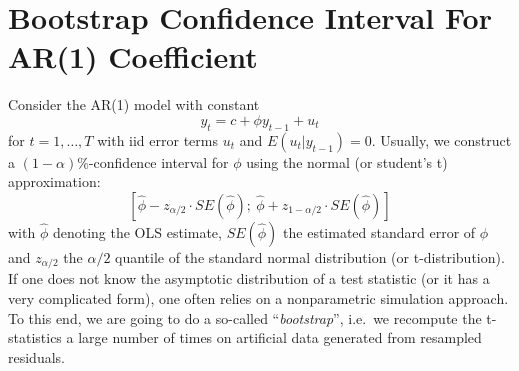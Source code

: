 \section[Bootstrap Confidence Interval For AR(1) Coefficient]{Bootstrap Confidence Interval For AR(1) Coefficient\label{ex:BootstrapConfidenceIntervalARone}}
Consider the AR(1) model with constant
\begin{equation*}
y_{t}=c +\phi y_{t-1}+u_{t}
\end{equation*}
for \(t=1,\ldots ,T\) with iid error terms \(u_{t}\) and \(E(u_{t}|y_{t-1})=0\).
Usually, we construct a \( (1-\alpha)\% \)-confidence interval for \( \phi \) using the normal (or student's t) approximation:
\begin{equation*}
\left[ \hat{\phi}-z_{\alpha/2}\cdot SE(\hat{\phi});\ \hat{\phi}+z_{1-\alpha/2}\cdot SE(\hat{\phi})\right]
\end{equation*}
  with \(\hat{\phi}\) denoting the OLS estimate,
  \(SE(\hat{\phi})\) the estimated standard error of \( \phi \)
  and \(z_{\alpha/2}\) the \(\alpha/2\) quantile of the standard normal distribution (or t-distribution).
If one does not know the asymptotic distribution of a test statistic
  (or it has a very complicated form),
  one often relies on a nonparametric simulation approach.
To this end, we are going to do a so-called \enquote{\emph{bootstrap}},
  i.e.\ we recompute the t-statistics a large number of times on artificial data
  generated from resampled residuals.\\
